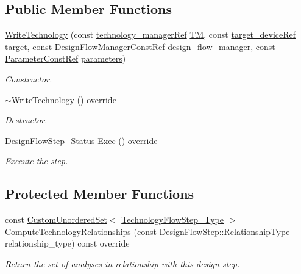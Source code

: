 \subsection*{Public Member Functions}
\begin{DoxyCompactItemize}
\item 
\hyperlink{classWriteTechnology_adc37a43fb3949dc14a5cabfb423ec030}{Write\+Technology} (const \hyperlink{technology__manager_8hpp_a4b9ecd440c804109c962654f9227244e}{technology\+\_\+manager\+Ref} \hyperlink{classTechnologyFlowStep_a4aeea30129ed65348c3bad932b3a135b}{TM}, const \hyperlink{target__device_8hpp_acedb2b7a617e27e6354a8049fee44eda}{target\+\_\+device\+Ref} \hyperlink{classTechnologyFlowStep_a1a16880c55bddc3f9dbc495636d7a8cb}{target}, const Design\+Flow\+Manager\+Const\+Ref \hyperlink{classDesignFlowStep_ab770677ddf087613add30024e16a5554}{design\+\_\+flow\+\_\+manager}, const \hyperlink{Parameter_8hpp_a37841774a6fcb479b597fdf8955eb4ea}{Parameter\+Const\+Ref} \hyperlink{classDesignFlowStep_a802eaafe8013df706370679d1a436949}{parameters})
\begin{DoxyCompactList}\small\item\em Constructor. \end{DoxyCompactList}\item 
\hyperlink{classWriteTechnology_ac8820d80a2018e628ce8553fc6cdde8e}{$\sim$\+Write\+Technology} () override
\begin{DoxyCompactList}\small\item\em Destructor. \end{DoxyCompactList}\item 
\hyperlink{design__flow__step_8hpp_afb1f0d73069c26076b8d31dbc8ebecdf}{Design\+Flow\+Step\+\_\+\+Status} \hyperlink{classWriteTechnology_a0effd2133532682e6d116262e4782bf5}{Exec} () override
\begin{DoxyCompactList}\small\item\em Execute the step. \end{DoxyCompactList}\end{DoxyCompactItemize}
\subsection*{Protected Member Functions}
\begin{DoxyCompactItemize}
\item 
const \hyperlink{classCustomUnorderedSet}{Custom\+Unordered\+Set}$<$ \hyperlink{technology__flow__step_8hpp_a65208cfec963a7d7def292f9db428292}{Technology\+Flow\+Step\+\_\+\+Type} $>$ \hyperlink{classWriteTechnology_a08646671bc7e22d2929cb41de50ed7bb}{Compute\+Technology\+Relationships} (const \hyperlink{classDesignFlowStep_a723a3baf19ff2ceb77bc13e099d0b1b7}{Design\+Flow\+Step\+::\+Relationship\+Type} relationship\+\_\+type) const override
\begin{DoxyCompactList}\small\item\em Return the set of analyses in relationship with this design step. \end{DoxyCompactList}\end{DoxyCompactItemize}
